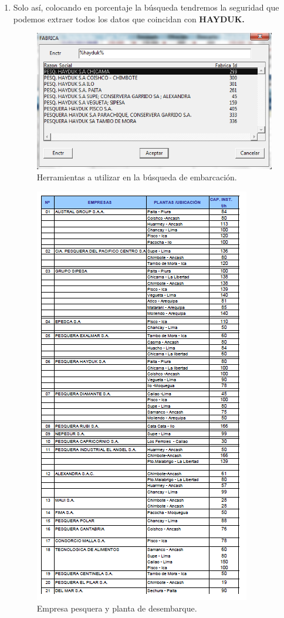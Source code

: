 \documentclass[a4paper,oneside,11pt]{book}
\begin{document}
\begin{enumerate}
 \item[] Solo así, colocando en porcentaje la búsqueda tendremos la seguridad que podemos extraer todos los datos que coincidan con \textbf{HAYDUK.}
  \begin{figure} [!h]
  	\begin{center}
  		\includegraphics[scale=0.7]{imagen_Manual_PBP/hayduk.png}
  		\caption{Herramientas a utilizar en la búsqueda de embarcación.}
  	\end{center}
  \end{figure}
  \begin{figure} [!h]
  	\begin{center}
  		\includegraphics[scale=1]{imagen_Manual_PBP/planta1}
  		\caption{Empresa pesquera y planta de desembarque.}
  	\end{center}
  \end{figure}
  

\end{enumerate}
\end{document}
